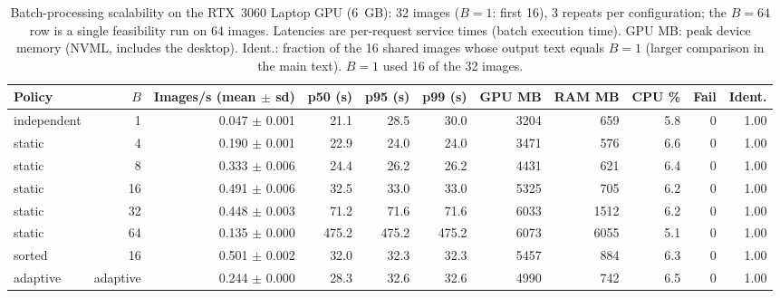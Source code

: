 \begin{table}[!t]
\centering
\scriptsize
\caption{Batch-processing scalability on the RTX~3060 Laptop GPU (6~GB): 32 images ($B{=}1$: first 16), 3 repeats per configuration; the $B{=}64$ row is a single feasibility run on 64 images. Latencies are per-request service times (batch execution time). GPU MB: peak device memory (NVML, includes the desktop). Ident.: fraction of the 16 shared images whose output text equals $B{=}1$ (larger comparison in the main text). $B{=}1$ used 16 of the 32 images.}
\label{tab:exp2}
\begin{adjustbox}{max width=\textwidth}
\begin{tabular}{lrrrrrrrrrr}
\toprule
Policy & $B$ & Images/s (mean $\pm$ sd) & p50 (s) & p95 (s) & p99 (s) & GPU MB & RAM MB & CPU \% & Fail & Ident. \\
\midrule
independent & 1 & 0.047 $\pm$ 0.001 & 21.1 & 28.5 & 30.0 & 3204 & 659 & 5.8 & 0 & 1.00 \\
static & 4 & 0.190 $\pm$ 0.001 & 22.9 & 24.0 & 24.0 & 3471 & 576 & 6.6 & 0 & 1.00 \\
static & 8 & 0.333 $\pm$ 0.006 & 24.4 & 26.2 & 26.2 & 4431 & 621 & 6.4 & 0 & 1.00 \\
static & 16 & 0.491 $\pm$ 0.006 & 32.5 & 33.0 & 33.0 & 5325 & 705 & 6.2 & 0 & 1.00 \\
static & 32 & 0.448 $\pm$ 0.003 & 71.2 & 71.6 & 71.6 & 6033 & 1512 & 6.2 & 0 & 1.00 \\
static & 64 & 0.135 $\pm$ 0.000 & 475.2 & 475.2 & 475.2 & 6073 & 6055 & 5.1 & 0 & 1.00 \\
sorted & 16 & 0.501 $\pm$ 0.002 & 32.0 & 32.3 & 32.3 & 5457 & 884 & 6.3 & 0 & 1.00 \\
adaptive & adaptive & 0.244 $\pm$ 0.000 & 28.3 & 32.6 & 32.6 & 4990 & 742 & 6.5 & 0 & 1.00 \\
\bottomrule
\end{tabular}
\end{adjustbox}
\end{table}
